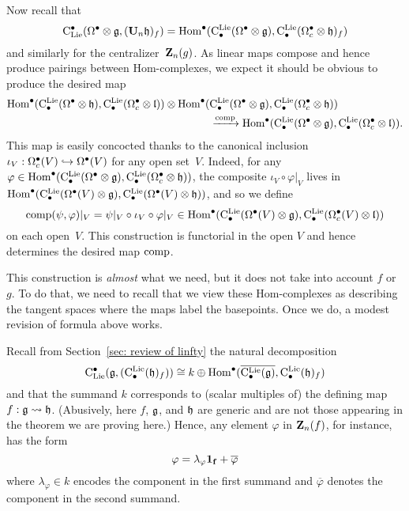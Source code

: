 \documentclass[11pt]{amsart}
\numberwithin{equation}{section}
\begin{document}
Now recall that
\[
{\rm C}_{\rm Lie}^\bullet(\Omega^\bullet \otimes \mathfrak g, (\mathbf U_n \mathfrak h)_f) = {\rm Hom}^\bullet({\rm C}^{\rm Lie}_\bullet(\Omega^\bullet \otimes \mathfrak g), {\rm C}^{\rm Lie}_\bullet(\Omega^\bullet_c \otimes \mathfrak h)_f)
\]
and similarly for the centralizer~$\mathbf Z_n(g)$.
As linear maps compose and hence produce pairings between Hom-complexes,
we expect it should be obvious to produce the desired map
\begin{align*}
{\rm Hom}^\bullet({\rm C}^{\rm Lie}_\bullet(\Omega^\bullet \otimes \mathfrak h), {\rm C}^{\rm Lie}_\bullet(\Omega^\bullet_c \otimes \mathfrak l)) 
\otimes {\rm Hom}^\bullet(&{\rm C}^{\rm Lie}_\bullet(\Omega^\bullet \otimes \mathfrak g), {\rm C}^{\rm Lie}_\bullet(\Omega^\bullet_c \otimes \mathfrak h))\\
 &\xrightarrow{{\rm comp}} {\rm Hom}^\bullet({\rm C}^{\rm Lie}_\bullet(\Omega^\bullet \otimes \mathfrak g), {\rm C}^{\rm Lie}_\bullet(\Omega^\bullet_c \otimes \mathfrak l)).
\end{align*}
This map is easily concocted thanks to the canonical inclusion $\iota_V: \Omega^\bullet_c(V) \hookrightarrow \Omega^\bullet(V)$ for any open set~$V$.
Indeed, for any $\varphi \in {\rm Hom}^\bullet({\rm C}^{\rm Lie}_\bullet(\Omega^\bullet \otimes \mathfrak g), {\rm C}^{\rm Lie}_\bullet(\Omega^\bullet_c \otimes \mathfrak h))$,
the composite $\iota_V \circ \varphi|_V$ lives in ${\rm Hom}^\bullet({\rm C}^{\rm Lie}_\bullet(\Omega^\bullet(V) \otimes \mathfrak g), {\rm C}^{\rm Lie}_\bullet(\Omega^\bullet(V) \otimes \mathfrak h))$,
and so we define
\[
{\rm comp}(\psi, \varphi)|_V = \psi|_V \circ \iota_V \circ \varphi|_V \in {\rm Hom}^\bullet({\rm C}^{\rm Lie}_\bullet(\Omega^\bullet(V) \otimes \mathfrak g), {\rm C}^{\rm Lie}_\bullet(\Omega^\bullet_c(V) \otimes \mathfrak l))
\]
on each open~$V$.
This construction is functorial in the open $V$ and hence determines the desired map ${\rm comp}$.

This construction is {\em almost} what we need, 
but it does not take into account $f$ or $g$.
To do that, we need to recall that we view these Hom-complexes as describing the tangent spaces where the maps label the basepoints.
Once we do, a modest revision of formula above works.

Recall from Section~\ref{sec: review of linfty} the natural decomposition 
\[
{\rm C}_{\rm Lie}^\bullet(\mathfrak g,({\rm C}^{\rm Lie}_\bullet(\mathfrak h)_f)) \cong k \oplus {\rm Hom}^\bullet(\overline{{\rm C}^{\rm Lie}_\bullet(\mathfrak g)}, {\rm C}^{\rm Lie}_\bullet(\mathfrak h)_f)
\]
and that the summand $k$ corresponds to (scalar multiples of) the defining map~$f: \mathfrak g \rightsquigarrow \mathfrak h$.
(Abusively, here $f$, $\mathfrak g$, and $\mathfrak h$ are generic and are not those appearing in the theorem we are proving here.)
Hence, any element $\varphi$ in $\mathbf Z_n(f)$, for instance, has the form
\[
\varphi =\lambda_\varphi {\bf 1_f} +\overline{\varphi}
\]
where $\lambda_\varphi \in k$ encodes the component in the first summand and $\overline{\varphi}$ denotes the component in the second summand.
\end{document}
